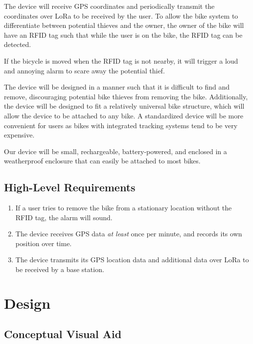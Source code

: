\documentclass{article}
\begin{document}
The device will receive GPS coordinates and periodically transmit the coordinates over LoRa to be received by the user. To allow the bike system to differentiate between potential thieves and the owner, the owner of the bike will have an RFID tag such that while the user is on the bike, the RFID tag can be detected. \begin{abstract}
	
\end{abstract}
If the bicycle is moved when the RFID tag is not nearby, it will trigger a loud and annoying alarm to scare away the potential thief.

The device will be designed in a manner such that it is difficult to find and remove, discouraging potential bike thieves from removing the bike. Additionally, the device will be designed to fit a relatively universal bike structure, which will allow the device to be attached to any bike. A standardized device will be more convenient for users as bikes with integrated tracking systems tend to be very expensive.

Our device will be small, rechargeable, battery-powered, and enclosed in a weatherproof enclosure that can easily be attached to most bikes.
\subsection{High-Level Requirements}

\begin{enumerate}
	\item If a user tries to remove the bike from a stationary location without the RFID tag, the alarm will sound. 
	
	\item The device receives GPS data \textit{at least} once per minute, and records its own position over time.  
	
	\item The device transmits its GPS location data and additional data over LoRa to be received by a base station. 
	
\end{enumerate}

\section{Design}
\subsection{Conceptual Visual Aid} 
\end{document}
